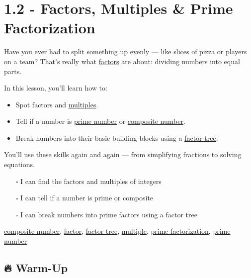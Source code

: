 \documentclass[
  letterpaper,
  DIV=11,
  numbers=noendperiod]{scrreprt}
\providecommand{\tightlist}{%
  \setlength{\itemsep}{0pt}\setlength{\parskip}{0pt}}
\begin{document}
\chapter*{1.2 - Factors, Multiples \& Prime
Factorization}\label{factors-multiples-prime-factorization}


Have you ever had to split something up evenly --- like slices of pizza
or players on a team? That's really what
\href{./glossary.html\#glossary-factor}{factors} are about: dividing
numbers into equal parts.

In this lesson, you'll learn how to:

\begin{itemize}
\item
  Spot factors and \href{./glossary.html\#glossary-multiple}{multiples}.
\item
  Tell if a number is
  \href{./glossary.html\#glossary-prime-number}{prime number} or
  \href{./glossary.html\#glossary-composite-number}{composite number}.
\item
  Break numbers into their basic building blocks using a
  \href{./glossary.html\#glossary-factor-tree}{factor tree}.
\end{itemize}

You'll use these skills again and again --- from simplifying fractions
to solving equations.

\begin{itemize}
\tightlist
\item[$\square$]
  I can find the factors and multiples of integers
\item[$\square$]
  I can tell if a number is prime or composite
\item[$\square$]
  I can break numbers into prime factors using a factor tree
\end{itemize}

\href{./glossary.html\#glossary-composite-number}{composite number},
\href{./glossary.html\#glossary-factor}{factor},
\href{./glossary.html\#glossary-factor-tree}{factor tree},
\href{./glossary.html\#glossary-multiple}{multiple},
\href{./glossary.html\#glossary-prime-factorization}{prime factorization},
\href{./glossary.html\#glossary-prime-number}{prime number}

\section*{🔥 Warm-Up}\label{warm-up-1}
\end{document}
